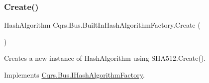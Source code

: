 \subsubsection{\texorpdfstring{Create()}{Create()}}
{\footnotesize\ttfamily Hash\+Algorithm Cqrs.\+Bus.\+Built\+In\+Hash\+Algorithm\+Factory.\+Create (\begin{DoxyParamCaption}{ }\end{DoxyParamCaption})}



Creates a new instance of Hash\+Algorithm using S\+H\+A512.\+Create(). 



Implements \hyperlink{interfaceCqrs_1_1Bus_1_1IHashAlgorithmFactory_ac455d44ba9db8007c06df94df54885ee_ac455d44ba9db8007c06df94df54885ee}{Cqrs.\+Bus.\+I\+Hash\+Algorithm\+Factory}.

